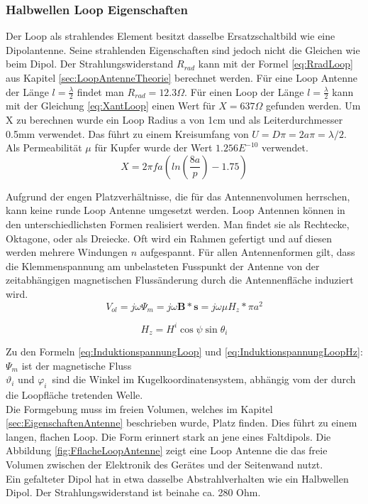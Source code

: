 \subsubsection{Halbwellen Loop Eigenschaften}
Der Loop als strahlendes Element besitzt dasselbe Ersatzschaltbild wie eine Dipolantenne. Seine strahlenden Eigenschaften sind jedoch nicht die Gleichen wie beim Dipol. Der Strahlungswiderstand $R_{rad}$ kann mit der Formel \ref{eq:RradLoop} aus Kapitel \ref{sec:LoopAntenneTheorie} berechnet werden. Für eine Loop Antenne der Länge $l=\frac{\lambda}{2}$ findet man $R_{rad} = 12.3\Omega$. Für einen Loop der Länge $l=\frac{\lambda}{2}$ kann mit der Gleichung \ref{eq:XantLoop} einen Wert für $X = 637 \Omega$ gefunden werden. Um X zu berechnen wurde ein Loop Radius a von 1cm und als Leiterdurchmesser 0.5mm verwendet. Das führt zu einem Kreisumfang von $U=D\pi=2a\pi=\lambda /2$. Als Permeabilität $\mu $ für Kupfer wurde der Wert $1.256E^{-10}$ verwendet.
\begin{equation}\label{eq:XantLoop}
X= 2\pi f a(ln \left( \frac{8a}{p} \right) - 1.75)
\end{equation}

Aufgrund der engen Platzverhältnisse, die für das Antennenvolumen herrschen, kann keine runde Loop Antenne umgesetzt werden. Loop Antennen können in den unterschiedlichsten Formen realisiert werden. Man findet sie als Rechtecke, Oktagone, oder als Dreiecke. Oft wird ein Rahmen gefertigt und auf diesen  werden mehrere Windungen $n$ aufgespannt. Für allen Antennenformen gilt, dass die Klemmenspannung am unbelasteten Fusspunkt der Antenne von der zeitabhängigen magnetischen Flussänderung durch die Antennenfläche induziert wird.
\begin{equation}\label{eq:InduktionspannungLoop}
V_{ol}= j\omega\Psi_{m}=j\omega\textbf{B}*\textbf{s}= j\omega\mu H_{z}*\pi a^{2}
\end{equation}

\begin{equation}\label{eq:InduktionspannungLoopHz}
H_{z}=H^{i}\cos\psi\sin\theta_{i}
\end{equation}

Zu den Formeln \ref{eq:InduktionspannungLoop} und \ref{eq:InduktionspannungLoopHz}: \\
$\Psi_{m}$ ist der magnetische Fluss\\
$\vartheta_{i}$ und $\varphi_{i}$\  sind die Winkel im Kugelkoordinatensystem, abhängig vom der durch die Loopfläche tretenden Welle.
 \\ 
Die Formgebung muss im freien Volumen, welches im Kapitel \ref{sec:EigenschaftenAntenne} beschrieben wurde, Platz finden. Dies führt zu einem langen, flachen Loop. Die Form erinnert stark an jene eines Faltdipols. Die Abbildung \ref{fig:FflacheLoopAntenne} zeigt eine Loop Antenne die das freie Volumen zwischen der Elektronik des Gerätes und der Seitenwand nutzt.\\
Ein gefalteter Dipol hat in etwa dasselbe Abstrahlverhalten wie ein Halbwellen Dipol. Der Strahlungswiderstand ist beinahe  ca.  280 Ohm. 



